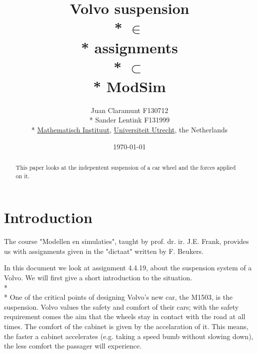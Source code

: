 \documentclass[a4paper]{article}
\begin{document}
	\title{Volvo suspension\\*
		\small
		$\in$\\*
		assignments\\*
		$\subset$\\*
		ModSim}
	\author{Juan Claramunt \small F130712\\*
    	Sander Lentink \small F131999 \\*
		\small
        	\href{http://wiskuu.nl}{Mathematisch Instituut},
            \href{http://uu.nl}{Universiteit Utrecht},
            the Netherlands}

	\date{\today}

\maketitle
\begin{abstract}
This paper looks at the indepentent suspension of a car wheel and the forces applied on it.
\end{abstract}





\newpage



\section{Introduction}

The course "Modellen en simulaties", taught by prof. dr. ir. J.E. Frank,
provides us with assignments given in the "dictaat" written by F. Beukers.

In this document we look at assignment 4.4.19, about the suspension system of a Volvo.
We will first give a short introduction to the situation.
\\*
\\*
One of the critical points of designing Volvo's new car, the M1503, is the suspension.
Volvo values the safety and comfort of their cars;
with the safety requirement comes the aim that the wheels stay in contact with the road at all times.
The comfort of the cabinet is given by the accelaration of it.
This means, the faster a cabinet accelerates (e.g. taking a speed bumb without slowing down),
the less comfort the passager will experience.
\end{document}
